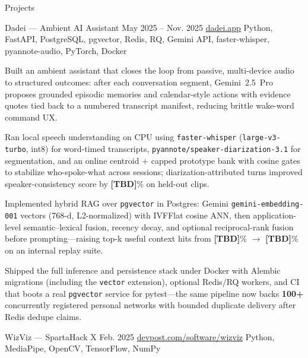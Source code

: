 \documentclass[
	11pt
]{../../resume}
\begin{document}
	\begin{rSection}{P}{rojects}
		\begin{rSectionEntry}
			{Dadei --- Ambient AI Assistant}
			{May 2025 -- Nov. 2025}
			{\href{https://dadei.app}{dadei.app}}
			{Python, FastAPI, PostgreSQL, pgvector, Redis, RQ, Gemini API, faster-whisper, pyannote-audio, PyTorch, Docker}
			{}

			\item Built an ambient assistant that closes the loop from passive, multi-device audio to structured outcomes: after each conversation segment, Gemini~2.5~Pro proposes grounded episodic memories and calendar-style actions with evidence quotes tied back to a numbered transcript manifest, reducing brittle wake-word command UX.
			\item Ran local speech understanding on CPU using \texttt{faster-whisper} (\texttt{large-v3-turbo}, int8) for word-timed transcripts, \texttt{pyannote/speaker-diarization-3.1} for segmentation, and an online centroid + capped prototype bank with cosine gates to stabilize who-spoke-what across sessions; diarization-attributed turns improved speaker-consistency score by \textbf{[TBD]}\% on held-out clips. %
			\item Implemented hybrid RAG over \texttt{pgvector} in Postgres: Gemini \texttt{gemini-embedding-001} vectors (768-d, L2-normalized) with IVFFlat cosine ANN, then application-level semantic--lexical fusion, recency decay, and optional reciprocal-rank fusion before prompting---raising top-k useful context hits from \textbf{[TBD]}\% $\rightarrow$ \textbf{[TBD]}\% on an internal replay suite. %
			\item Shipped the full inference and persistence stack under Docker with Alembic migrations (including the \texttt{vector} extension), optional Redis/RQ workers, and CI that boots a real \texttt{pgvector} service for pytest---the same pipeline now backs \textbf{100+} concurrently registered personal networks with bounded duplicate delivery after Redis dedupe claims. %
		\end{rSectionEntry}

		\begin{rSectionEntry}
			{WizViz --- SpartaHack X}
			{Feb. 2025}
			{\href{https://devpost.com/software/wizviz}{devpost.com/software/wizviz}}
			{Python, MediaPipe, OpenCV, TensorFlow, NumPy}
			{}


\end{rSectionEntry}
\end{rSection}
\end{document}
